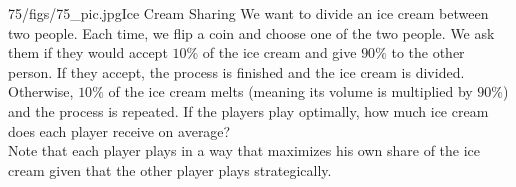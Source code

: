\begin{problem}{75/figs/75_pic.jpg}{Ice Cream Sharing} We want to divide an ice cream between two people. Each time, we flip a coin and choose one of the two people. We ask them if they would accept $10\%$ of the ice cream and give $90\%$ to the other person. If they accept, the process is finished and the ice cream is divided. Otherwise, $10\%$ of the ice cream melts (meaning its volume is multiplied by $90\%$) and the process is repeated. If the players play optimally, how much ice cream does each player receive on average?\\[0.2cm]
	
Note that each player plays in a way that maximizes his own share of the ice cream given that the other player plays strategically.
\end{problem}